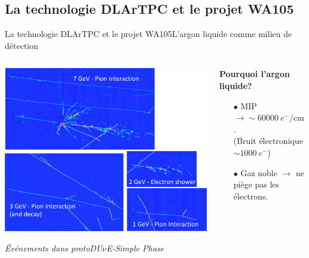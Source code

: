     \subsection[DLArTPC et WA105]{La technologie DLArTPC et le projet WA105}

  \begin{frame}{La technologie DLArTPC et le projet WA105}{L'argon liquide comme milieu de détection}
	  \begin{scriptsize}
    	\begin{columns}
    		\begin{column}{0.6\textwidth}
    			\centering
    			\includegraphics[width=\textwidth]{./pictures/SP_evt.png}\\
    			\flushleft
    			\begin{footnotesize}\textit{Événements dans protoDU$\nu$E-Simple Phase}\end{footnotesize}
    		\end{column}
    		\begin{column}{0.4\textwidth}
    			\begin{footnotesize}
    				\textbf{Pourquoi l'argon liquide?}
    			\end{footnotesize}
    			\begin{itemize}
    				\item[$\bullet$] MIP $\rightarrow\sim\SI{60000}{e^-\per\centi\meter}$. \\
    				(Bruit électronique $\sim \SI{1000}{e^-}$)
    				\item[$\bullet$] Gaz noble $\rightarrow$ ne piège pas les électrons.

\end{itemize}
\end{column}
\end{columns}
\end{scriptsize}
\end{frame}
